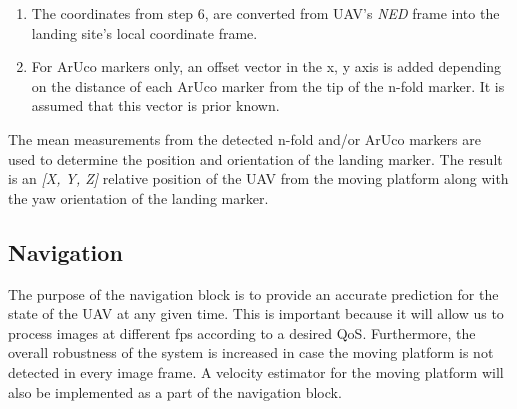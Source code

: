\documentclass[conference, onecolumn, draftclsnofoot]{IEEEtran}
\begin{document}
\begin{enumerate}



\item The coordinates from step 6, are converted from UAV's \emph{NED} frame 
into the landing site's local coordinate frame.


\item For ArUco markers only, an offset vector in the x, y axis is added depending 
on the distance of each ArUco marker from the tip of the n-fold marker. 
It is assumed that this vector is prior known.

\end{enumerate}
%
The mean measurements from the detected n-fold and/or ArUco markers
are used to determine the position and orientation of the landing
marker. The result is an \emph{[X, Y, Z]} relative position of the UAV from
the moving platform along with the yaw orientation of the landing
marker.


\subsection{Navigation}
\label{sec:Navigation}

The purpose of the navigation block is to provide an accurate
prediction for the state of the UAV at any given time. This is
important because it will allow us to process images at different fps
according to a desired QoS. Furthermore, the overall robustness of the
system is increased in case the moving platform is not detected in
every image frame. A velocity estimator for the moving platform will
also be implemented as a part of the navigation block.
\end{document}
